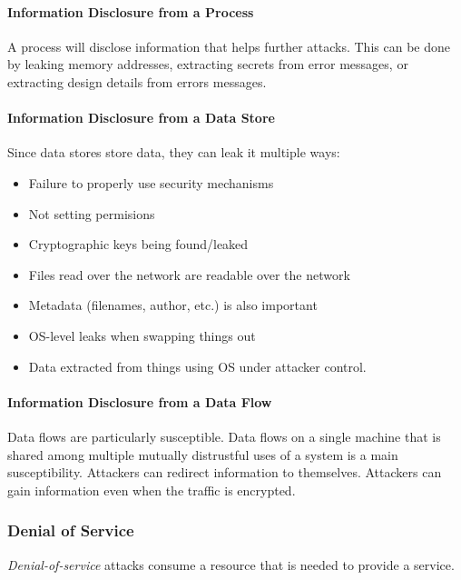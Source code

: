 \paragraph{Information Disclosure from a Process}\label{par:Information_Disclosure_Process}
A process will disclose information that helps further attacks.
This can be done by leaking memory addresses, extracting secrets from error messages, or extracting design details from errors messages.

\paragraph{Information Disclosure from a Data Store}\label{par:Information_Disclosure_Data_Store}
Since data stores store data, they can leak it multiple ways:
\begin{itemize}[noitemsep]
\item Failure to properly use security mechanisms
\item Not setting permisions
\item Cryptographic keys being found/leaked
\item Files read over the network are readable over the network
\item Metadata (filenames, author, etc.) is also important
\item OS-level leaks when swapping things out
\item Data extracted from things using OS under attacker control.
\end{itemize}

\paragraph{Information Disclosure from a Data Flow}\label{par:Information_Disclosure_Data_Flow}
Data flows are particularly susceptible.
Data flows on a single machine that is shared among multiple mutually distrustful uses of a system is a main susceptibility.
Attackers can redirect information to themselves.
Attackers can gain information even when the traffic is encrypted.

\subsubsection{Denial of Service}\label{subsubsec:Denial_of_Service}
\begin{definition}\label{def:Denial_of_Service}
  \emph{Denial-of-service} attacks consume a resource that is needed to provide a service.
\end{definition}


